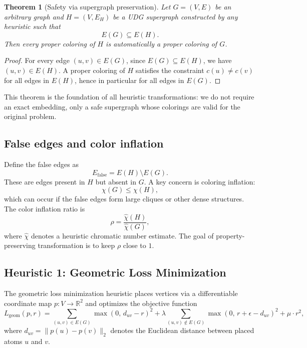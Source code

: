 \documentclass[11pt]{article}
\newtheorem{theorem}{Theorem}
\newcommand{\Real}{\mathbb{R}}
\newcommand{\Efalse}{E_{\mathrm{false}}}
\newcommand{\chihat}{\widehat{\chi}}
\begin{document}
\begin{theorem}[Safety via supergraph preservation]
Let $G=(V,E)$ be an arbitrary graph and $H=(V,E_H)$ be a UDG supergraph constructed by any heuristic such that
\[
E(G) \subseteq E(H).
\]
Then every proper coloring of $H$ is automatically a proper coloring of $G$.
\end{theorem}

\begin{proof}
For every edge $(u,v)\in E(G)$, since $E(G) \subseteq E(H)$, we have $(u,v)\in E(H)$.  A proper coloring of $H$ satisfies the constraint $c(u)\neq c(v)$ for all edges in $E(H)$, hence in particular for all edges in $E(G)$.
\end{proof}

This theorem is the foundation of all heuristic transformations: we do not require an exact embedding, only a safe supergraph whose colorings are valid for the original problem.

\subsection{False edges and color inflation}

Define the false edges as
\[
\Efalse = E(H) \setminus E(G).
\]
These are edges present in $H$ but absent in $G$. A key concern is coloring inflation:
\[
\chi(G) \le \chi(H),
\]
which can occur if the false edges form large cliques or other dense structures. The color inflation ratio is
\[
\rho = \frac{\chihat(H)}{\chihat(G)},
\]
where $\chihat$ denotes a heuristic chromatic number estimate. The goal of property-preserving transformation is to keep $\rho$ close to $1$.

\newpage

\subsection{Heuristic 1: Geometric Loss Minimization}

The geometric loss minimization heuristic places vertices via a differentiable coordinate map $p:V\to\Real^2$ and optimizes the objective function
\[
L_{\mathrm{geom}}(p,r)
=
\sum_{(u,v)\in E(G)} \max(0,\, d_{uv}-r)^2
+
\lambda\sum_{(u,v)\notin E(G)} \max(0,\, r+\epsilon-d_{uv})^2
+
\mu \cdot r^2,
\]
where $d_{uv}=\|p(u)-p(v)\|_2$ denotes the Euclidean distance between placed atoms $u$ and $v$.
\end{document}

